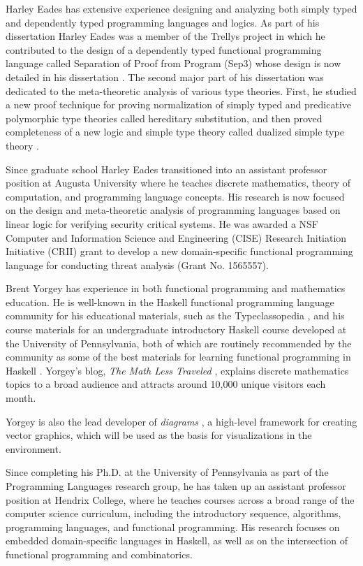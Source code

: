 Harley Eades has extensive experience designing and analyzing both
simply typed and dependently typed programming languages and
logics. As part of his dissertation Harley Eades was a member of the
Trellys project \citep{Kimmel:2013,Sjoberg:2012} in which he
contributed to the design of a dependently typed functional
programming language called Separation of Proof from Program (Sep3)
whose design is now detailed in his dissertation
\citep{Eades:2014b,Kimmel:2013}. The second major part of his
dissertation was dedicated to the meta-theoretic analysis of various
type theories. First, he studied a new proof technique for proving
normalization of simply typed and predicative polymorphic type
theories called hereditary substitution, and then proved completeness
of a new logic and simple type theory called dualized simple type
theory \citep{Eades:2014b}.

Since graduate school Harley Eades transitioned into an assistant
professor position at Augusta University where he teaches discrete
mathematics, theory of computation, and programming language
concepts. His research is now focused on the design and meta-theoretic
analysis of programming languages based on linear logic for verifying
security critical systems.  He was awarded a NSF Computer and
Information Science and Engineering (CISE) Research Initiation
Initiative (CRII) grant to develop a new domain-specific functional
programming language for conducting threat analysis (Grant
No. 1565557).

Brent Yorgey has experience in both functional programming and
mathematics education.  He is well-known in the Haskell functional
programming language community for his educational materials, such as
the Typeclassopedia \citep{Typeclassopedia}, and his course
materials for an undergraduate introductory Haskell course developed
at the University of Pennsylvania, both of which are routinely
recommended by the community as some of the best materials for
learning functional programming in Haskell \citep{bitemyapp-learn}.
Yorgey's blog, \emph{The Math Less Traveled} \citep{yorgey-tmlt},
explains discrete mathematics topics to a broad audience and attracts
around 10,000 unique visitors each month.

Yorgey is also the lead developer
of \emph{diagrams} \citep{diagrams-web, Yates:2015}, a
high-level framework for creating vector graphics, which will be used
as the basis for visualizations in the \thelang environment.

Since completing his Ph.D. at the University of Pennsylvania as part
of the Programming Languages research group, he has taken up an
assistant professor position at Hendrix College, where he teaches
courses across a broad range of the computer science curriculum,
including the introductory sequence, algorithms, programming
languages, and functional programming.  His research focuses on
embedded domain-specific languages in Haskell, as well as on the
intersection of functional programming and combinatorics.
